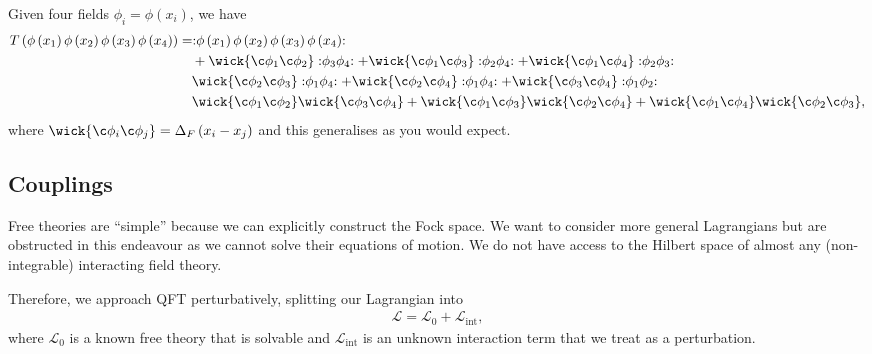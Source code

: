 \begin{example}
    Given four fields $\phi_i = \phi \left( x_{i} \right) $, we have
    \begin{align}
        T \left( \phi \left( x_1 \right) \phi \left( x_2 \right) \phi \left( x_3 \right) \phi \left( x_4 \right)  \right) &= \nord{ \phi \left( x_1 \right) \phi \left( x_2 \right) \phi \left( x_3 \right) \phi \left( x_4 \right) } \nonumber \\
                                                                                                                          &\quad + \wick{ \c \phi_1 \c \phi_2} \nord{\phi_3 \phi_4 } + \wick{\c \phi_1 \c \phi_3} \nord{\phi_2 \phi_4} + \wick{ \c \phi_1 \c \phi_4} \nord{\phi_2 \phi_3} \nonumber \\
                                                                                                                          &\quad \wick{ \c \phi_2 \c \phi_3} \nord{\phi_1 \phi_4} + \wick {\c \phi_2 \c \phi_4} \nord{\phi_1 \phi_4} + \wick{ \c \phi_3 \c \phi_4} \nord{\phi_1 \phi_2} \nonumber \\
                                                                                                                          &\quad \wick{\c \phi_1 \c \phi_2} \wick{\c \phi_3 \c \phi_4} +  \wick{ \c \phi_1 \c \phi_3} \wick{\c \phi_2 \c \phi_4} + \wick{ \c \phi_1 \c \phi_4} \wick{ \c \phi_2 \c \phi_3}
    ,\end{align}
    where $\wick{\c \phi_i \c \phi_j} = \Delta_F \left( x_{i} - x_{j} \right) $ and this generalises as you would expect.
\end{example}


\subsection{Couplings}



Free theories are ``simple'' because we can explicitly construct the Fock space. We want to consider more general Lagrangians but are obstructed in this endeavour as we cannot solve their equations of motion. We do not have access to the Hilbert space of almost any (non-integrable) interacting field theory.

Therefore, we approach QFT perturbatively, splitting our Lagrangian into
\begin{align}
    \mathcal{L} = \mathcal{L}_0 + \mathcal{L}_{\text{int}}
,\end{align}
where $\mathcal{L}_0$ is a known free theory that is solvable and $\mathcal{L}_{\text{int}}$ is an unknown interaction term that we treat as a perturbation.

